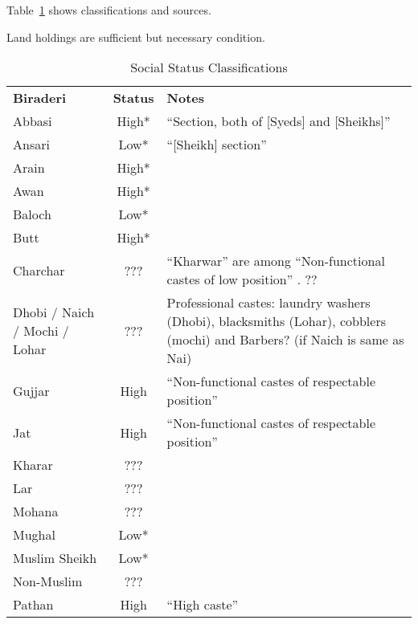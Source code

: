 \documentclass[Eubank_pk_ethnic_sorting.tex]{subfiles}
\begin{document}
Table~\ref{appendix_classification_table} shows classifications and sources. 

Land holdings are sufficient but necessary condition. 



\begin{table}[]
\centering
\caption{Social Status Classifications}
\label{appendix_classification_table}
\begin{tabular}{lcl}
\textbf{Biraderi}             & \textbf{Status} & \textbf{Notes} \\
Abbasi                        & High*  			& ``Section, both of [Syeds] and [Sheikhs]'' \citep[p. 341]{Blunt:1969vq}      \\
Ansari                        & Low*   			& ``[Sheikh] section''      \\
Arain                         & High*  			&       \\
Awan                          & High*  			&       \\
Baloch                        & Low*   			&       \\
Butt                          & High*  			&       \\
Charchar                      & ???    			& ``Kharwar'' are among ``Non-functional castes of low position'' \citep[p. 106]{Blunt:1969vq}. ?? \\
Dhobi / Naich / Mochi / Lohar & ???    			& Professional castes: laundry washers (Dhobi), blacksmiths (Lohar), cobblers (mochi) and Barbers? (if Naich is same as Nai)       \\
Gujjar                        & High  			& ``Non-functional castes of respectable position'' \citep[p. 106]{Blunt:1969vq} \\
Jat                           & High  			& ``Non-functional castes of respectable position'' \citep[p. 106]{Blunt:1969vq} \\
Kharar                        & ???    			&       \\
Lar                           & ???    			&       \\
Mohana                        & ???    			&       \\
Mughal                        & Low*   			&       \\
Muslim Sheikh                 & Low*   			&       \\
Non-Muslim					  & ???    			&       \\
Pathan                        & High  			& ``High caste'' \citep[p. 268]{Blunt:1969vq} \\

\end{tabular}
\end{table}
\end{document}
